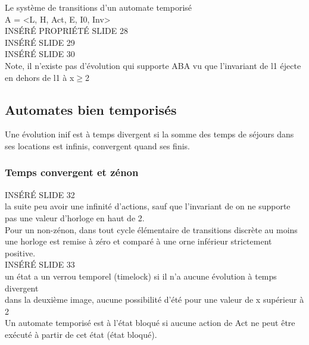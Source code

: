 \documentclass[oneside]{book}
\begin{document}
    Le système de transitions d'un automate temporisé\\
    
    A = <L, H, Act, E, I0, Inv>\\
    
    INSÉRÉ PROPRIÉTÉ SLIDE 28\\
    
    INSÉRÉ SLIDE 29\\
    
    INSÉRÉ SLIDE 30\\
    Note, il n'existe pas d'évolution qui supporte ABA vu que l'invariant de l1 éjecte en dehors de l1 à x$\geq$2\\
    
    \subsection{Automates bien temporisés}
    
    Une évolution inif est à temps divergent si la somme des temps de séjours dans ses locations est infinis, convergent quand ses finis.\\
    
    \subsubsection{Temps convergent et zénon}
    INSÉRÉ SLIDE 32\\
    
    la suite peu avoir une infinité d'actions, sauf que l'invariant de on ne supporte pas une valeur d'horloge en haut de 2.\\
    
    Pour un non-zénon, dans tout cycle élémentaire de transitions discrète au moins une horloge est remise à zéro et comparé à une orne inférieur strictement positive.\\
    
    INSÉRÉ SLIDE 33\\
    
    un état a un verrou temporel (timelock) si il n'a aucune évolution à temps divergent \\
    
    dans la deuxième image, aucune possibilité d'été pour une valeur de x supérieur à 2\\
    
    Un automate temporisé est à l'état bloqué si aucune action de Act ne peut être exécuté à partir de cet état (état bloqué).\\
    
\end{document}
